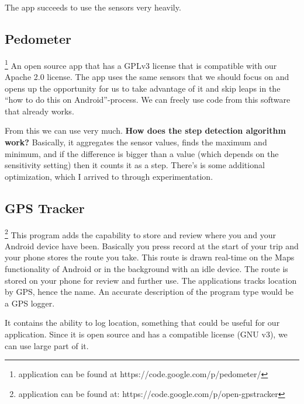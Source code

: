 The app succeeds to use the sensors very heavily.

\subsection{Pedometer}\footnote{application can be found at https://code.google.com/p/pedometer/} 
An open source app that has a GPLv3 license that is compatible with our Apache 2.0 license. The app uses the same sensors that we should focus on and opens up the opportunity for us to take advantage of it and skip leaps in the “how to do this on Android”-process. We can freely use code from this software that already works.

From this we can use very much.
\textbf{How does the step detection algorithm work?}
Basically, it aggregates the sensor values, finds the maximum and minimum, and if the difference is bigger than a value (which depends on the sensitivity setting) then it counts it as a step. There's is some additional optimization, which I arrived to through experimentation.

\subsection{GPS Tracker}\footnote{application can be found at: https://code.google.com/p/open-gpstracker}
This program adds the capability to store and review where you and your Android device have been. Basically you press record at the start of your trip and your phone stores the route you take. This route is drawn real-time on the Maps functionality of Android or in the background with an idle device. The route is stored on your phone for review and further use. The applications tracks location by GPS, hence the name. An accurate description of the program type would be a GPS logger.

It contains the ability to log location, something that could be useful for our application. Since it is open source and has a compatible license (GNU v3), we can use large part of it.


